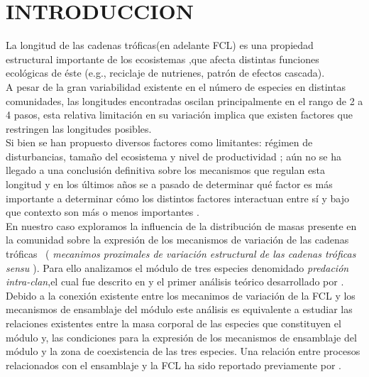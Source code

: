 \section{INTRODUCCION}

La longitud de las cadenas tr\'oficas(en adelante FCL) es una propiedad estructural importante de los ecosistemas ,que afecta distintas funciones ecol\'ogicas de \'este (e.g., reciclaje de nutrienes, patr\'on de efectos cascada).\\
A pesar de la gran variabilidad existente en el n\'umero de especies en distintas comunidades, las longitudes encontradas oscilan principalmente en el rango de 2 a 4 pasos\citep{elton1927animal,pimm1978feeding,yodzis1981structure,williams2004limits}, esta relativa limitaci\'on en su variaci\'on implica que existen factores que restringen las longitudes posibles.\\
Si bien se han propuesto diversos factores como limitantes: r\'egimen de disturbancias, tama\~no del ecosistema y nivel de productividad \citep{post2002long,takimoto2013environmental}; a\'un no se ha llegado a una conclusi\'on definitiva sobre los mecanismos que regulan esta longitud \citep{sterner1997enigma,takimoto2013environmental} y en los \'ultimos a\~nos se a pasado de determinar qu\'e factor es m\'as importante a determinar c\'omo los distintos factores interactuan entre s\'i y bajo que contexto son m\'as o menos importantes \citep{post2002long}.\\

En nuestro caso exploramos la influencia de la distribuci\'on de masas presente en la comunidad sobre la expresi\'on de los mecanismos de variaci\'on de las cadenas tr\'oficas \ ( \emph{mecanimos proximales de variaci\'on estructural de las cadenas tr\'oficas sensu \cite{TP2007proximate}}). Para ello analizamos el m\'odulo de tres especies denomidado \emph{predaci\'on intra-clan},el cual fue descrito en \cite{polis1989ecology} y el primer an\'alisis te\'orico desarrollado por \cite{holt1997theoretical}. Debido a la conexi\'on existente entre los mecanimos de variaci\'on de la FCL y los mecanismos de ensamblaje del m\'odulo\citep{TP2007proximate} este an\'alisis es equivalente a estudiar las relaciones existentes entre la masa corporal de las especies que constituyen el m\'odulo y, las condiciones para la expresi\'on de los mecanismos de ensamblaje del m\'odulo y la zona de coexistencia de las tres especies. Una relaci\'on entre procesos relacionados con el ensamblaje y la FCL ha sido reportado previamente por \citet{holt2002food}.\\

